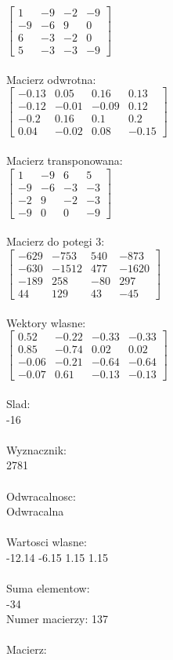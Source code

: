 \documentclass[a4paper,12pt]{article}
\begin{document}
$\begin{bmatrix} 1&-9&-2&-9\\-9&-6&9&0\\6&-3&-2&0\\5&-3&-3&-9 \end{bmatrix}$
\\
\\
Macierz odwrotna:\\

$\begin{bmatrix} -0.13&0.05&0.16&0.13\\-0.12&-0.01&-0.09&0.12\\-0.2&0.16&0.1&0.2\\0.04&-0.02&0.08&-0.15 \end{bmatrix}$
\\
\\
Macierz transponowana:\\

$\begin{bmatrix} 1&-9&6&5\\-9&-6&-3&-3\\-2&9&-2&-3\\-9&0&0&-9 \end{bmatrix}$
\\
\\
Macierz do potegi 3:\\

$\begin{bmatrix} -629&-753&540&-873\\-630&-1512&477&-1620\\-189&258&-80&297\\44&129&43&-45 \end{bmatrix}$
\\
\\
Wektory wlasne:\\

$\begin{bmatrix} 0.52&-0.22&-0.33&-0.33\\0.85&-0.74&0.02&0.02\\-0.06&-0.21&-0.64&-0.64\\-0.07&0.61&-0.13&-0.13 \end{bmatrix}$
\\
\\
Slad:\\
-16
\\
\\
Wyznacznik:\\
2781
\\
\\
Odwracalnosc:\\
Odwracalna
\\
\\
Wartosci wlasne:\\
-12.14 -6.15 1.15 1.15
\\
\\
Suma elementow:\\
-34
\\
\newpage
Numer macierzy:
137
\\
\\
Macierz:\\
\end{document}
